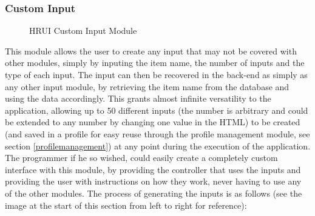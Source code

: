 \subsubsection{Custom Input} \label{custominput}
\begin{figure}[H]
\centering
\captionsetup{justification=centering}
\caption{HRUI Custom Input Module}
\end{figure}
This module allows the user to create any input that may not be covered with other modules, simply by inputing the item name, 
the number of inputs and the type of each input. The input can then be recovered in the back-end as simply as any other input 
module, by retrieving the item name from the database and using the data accordingly. This grants almost infinite versatility 
to the application, allowing up to 50 different inputs (the number is arbitrary and could be extended to any number by 
changing one value in the HTML) to be created (and saved in a profile for easy reuse through the profile management module, 
see section \ref{profilemanagement}) at any point during the execution of the application. The programmer if he so wished, 
could easily create a completely custom interface with this module, by providing the controller that uses the inputs and 
providing the user with instructions on how they work, never having to use any of the other modules. The process of generating 
the inputs is as follows (see the image at the start of this section from left to right for reference):
